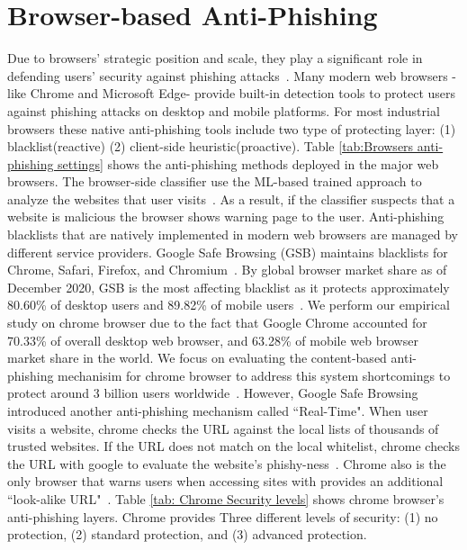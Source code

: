 
\section{Browser-based Anti-Phishing}
\label{s:browser-based}
Due to browsers' strategic position and scale, they play a significant role in defending users' security against phishing attacks~\cite{ma2009beyond}. Many modern web browsers -like Chrome and Microsoft Edge- provide built-in detection tools to protect users against phishing attacks on desktop and mobile platforms. For most industrial browsers these native anti-phishing tools include two type of protecting layer: (1) blacklist(reactive) (2) client-side heuristic(proactive).
Table \ref{tab:Browsers anti-phishing settings} shows the anti-phishing methods deployed in the major web browsers.
The browser-side classifier use the ML-based trained approach to analyze the websites that user visits~\cite{liang2016cracking}. As a result, if the classifier suspects that a website is malicious the browser shows warning page to the user.
Anti-phishing blacklists that are natively implemented in modern web browsers are managed by different service providers. Google Safe Browsing (GSB) maintains blacklists for Chrome, Safari, Firefox, and Chromium~\cite{safebrowsing}.
By global browser market share as of December 2020, GSB is the most affecting blacklist as it protects approximately 80.60\%  of desktop users and 89.82\%  of mobile users~\cite{statcounterall,browsermarketshare}. We perform our empirical study on chrome browser due to the fact that Google Chrome accounted for 70.33\%  of overall desktop web browser, and 63.28\%  of mobile web browser market share in the world. We focus on evaluating the content-based anti-phishing mechanisim for chrome browser to address this system shortcomings to protect around 3 billion users worldwide~\cite{statcounterdesktop,statcountermobile}.
However, Google Safe Browsing introduced another anti-phishing mechanism called ``Real-Time". When user visits a website, chrome checks the URL against the local lists of thousands of trusted websites. If the URL does not match on the local whitelist, chrome checks the URL with google to evaluate the website's phishy-ness~\cite{googlechromeprivacywhitepaper}. Chrome also is the only browser that warns users when accessing sites with provides an additional ``look-alike URL"~\cite{cimpanu_2019}.
Table \ref{tab: Chrome Security levels} shows chrome browser's anti-phishing layers.
Chrome provides Three different levels of security: (1) no protection, (2) standard protection, and (3) advanced protection.

